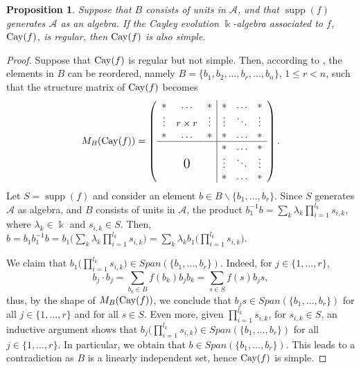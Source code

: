 \documentclass[a4paper,12pt]{amsart}
\newtheorem{proposition}[theorem]{Proposition}
\theoremstyle{definition}
\theoremstyle{remark}
\newcommand{\Cay}{{\rm Cay}}
\newcommand{\supp}{\operatorname{supp}}
\newcommand{\A}{\mathcal{A}}
\begin{document}
\begin{proposition}\label{prop:Cay simple_algebra}
Suppose that $B$ consists of units in $\A$, and that $\supp(f)$ generates $\A$ as an algebra. If the Cayley evolution $\Bbbk$-algebra associated to $f$, $\Cay(f)$, is regular, then $\Cay(f)$  is also simple.
\end{proposition}
\begin{proof}
	Suppose that $\Cay(f)$ is regular but not simple. Then, according to  \cite[Corollary 4.6]{Cabrera-Siles-Velasco}, the elements in $B$ can be reordered, namely $B=\{b_{1},b_{2},\ldots,b_{r},\ldots,b_n\}$, $1\leq r<n$, such that the structure matrix of $\Cay(f)$ becomes
	$$M_B(\Cay(f))=\left(
	\begin{array}{ccc|ccc}
	* & \ldots  & *  & * & \ldots & *\\
	\vdots & r \times r  & \vdots  & \vdots  & \ddots & \vdots\\
	* & \ldots  & *  & *  & \ldots  & *\\
	\hline
	&  &   & * & \ldots  & *\\
	 & \text{\Large 0}&   & \vdots & \ddots  & \vdots\\
	 & & & * & \ldots  & *\\
	\end{array}
	\right).$$	
Let $S=\supp(f)$ and consider an element $b\in B\smallsetminus\{b_1,\ldots,b_r\}$. Since $S$ generates $\A$ as algebra, and $B$ consists of units in $\A$, the product $b_1^{-1}b=\sum_k \lambda_k \prod_{i=1}^{l_k}s_{i,k}$, where $\lambda_k\in\Bbbk$ and $s_{i,k}\in S$. Then,
$b  = b_1b_1^{-1}b
= b_1\big(\sum_k \lambda_k \prod_{i=1}^{l_k}s_{i,k}\big)
= \sum_k \lambda_k b_1\big(\prod_{i=1}^{l_k}s_{i,k}\big).$

We claim that $b_1\big(\prod_{i=1}^{l_k}s_{i,k}\big) \in Span(\{b_1,\ldots,b_r\})$. Indeed, for $j\in\{1,\ldots,r\}$,
	$$b_j\cdot b_j=\sum_{b_k\in B}f(b_k)b_jb_k=\sum_{s\in S}f(s)b_js,$$
thus,  by the shape of $M_B(\Cay(f))$, we conclude that $b_js\in Span ( \{b_1,\ldots,b_r\} )$ for all $j\in\{1,\ldots,r\}$ and for all $s\in S$. Even more, given $\prod_{i=1}^{l_k}s_{i,k}$, for $s_{i,k}\in S$, an inductive argument shows that  $b_j\big(\prod_{i=1}^{l_k}s_{i,k}\big)\in Span(\{b_1,\ldots,b_r\})$ for all $j\in\{1,\ldots,r\}$. In particular, we obtain that $b \in Span(\{b_1,\ldots,b_r\}).$ This leads to a contradiction as $B$ is a linearly independent set,  hence $\Cay(f)$ is simple.
	



\end{proof}
\end{document}
